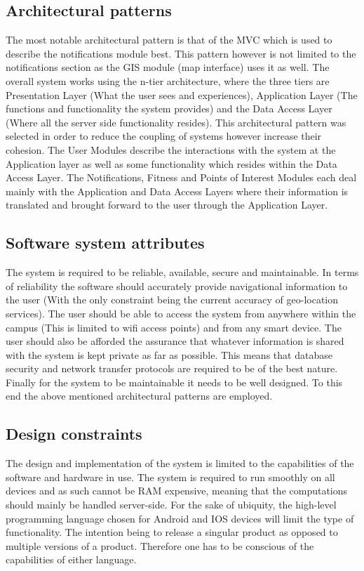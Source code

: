 \documentclass{article}
\begin{document}
		\subsection{Architectural patterns}
		
		The most notable architectural pattern is that of the MVC which is used to describe the notifications module best. This pattern however is not limited to the notifications section as the GIS module (map interface) uses it as well.
		The overall system works using the n-tier architecture, where the three tiers are Presentation Layer (What the user sees and experiences), Application Layer (The functions and functionality the system provides) and the Data Access Layer (Where all the server side functionality resides). This architectural pattern was selected in order to reduce the coupling of systems however increase their cohesion. The User Modules describe the interactions with the system at the Application layer as well as some functionality which resides within the Data Access Layer. The Notifications, Fitness and Points of Interest Modules each deal mainly with the Application and Data Access Layers where their information is translated and brought forward to the user through the Application Layer. 
		\subsection{Software system attributes}
		The system is required to be reliable, available, secure and maintainable.
		In terms of reliability the software should accurately provide navigational information to the user (With the only constraint being the current accuracy of geo-location services). The user should be able to access the system from anywhere within the campus (This is limited to wifi access points) and from any smart device. The user should also be afforded the assurance that whatever information is shared with the system is kept private as far as possible. This means that database security and network transfer protocols are required to be of the best nature. Finally for the system to be maintainable it needs to be well designed. To this end the above mentioned architectural patterns are employed. 
		\subsection{Design constraints}
		The design and implementation of the system is limited to the capabilities of the software and hardware in use. The system is required to run smoothly on all devices and as such cannot be RAM expensive, meaning that the computations should mainly be handled server-side. For the sake of ubiquity, the high-level programming language chosen for Android and IOS devices will limit the type of functionality. The intention being to release a singular product as opposed to multiple versions of a product. Therefore one has to be conscious of the capabilities of either language.
\end{document}

